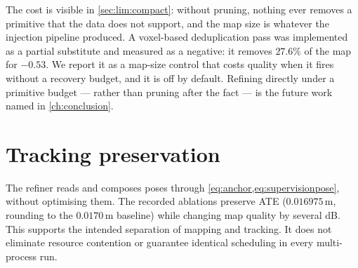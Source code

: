 The cost is visible in \cref{sec:lim:compact}: without pruning, nothing ever
removes a primitive that the data does not support, and the map size is
whatever the injection pipeline produced. A voxel-based deduplication pass was
implemented as a partial substitute and measured as a negative: it removes
$27.6\%$ of the map for $-0.53$\dB{}. We report it as a map-size control that
costs quality when it fires without a recovery budget, and it is off by
default. Refining directly under a primitive budget --- rather than pruning
after the fact --- is the future work named in \cref{ch:conclusion}.

\section{Tracking preservation}
\label{sec:refiner:invariant}

The refiner reads and composes poses through
\cref{eq:anchor,eq:supervisionpose}, without optimising them. The recorded
ablations preserve ATE ($0.016975$\,m, rounding to the $0.0170$\,m baseline)
while changing map quality by several dB. This supports the intended
separation of mapping and tracking. It does not eliminate resource contention
or guarantee identical scheduling in every multi-process run.
